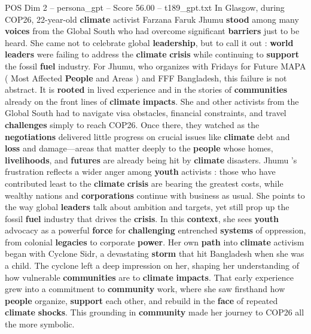 \begin{textsample}{POS Dim 2 – persona\_gpt – Score 56.00 – t189\_gpt.txt}  \label{ex:f2_pos_019}
In Glasgow, during COP26, 22-year-old \textbf{climate} activist Farzana Faruk Jhumu \textbf{stood} among many \textbf{voices} from the Global South who had overcome significant \textbf{barriers} just to be heard.
She came not to celebrate global \textbf{leadership}, but to call it out : \textbf{world} \textbf{leaders} were failing to address the \textbf{climate} \textbf{crisis} while continuing to \textbf{support} the fossil \textbf{fuel} industry.
For Jhumu, who organizes with Fridays for Future MAPA ( Most Affected \textbf{People} and Areas ) and FFF Bangladesh, this failure is not abstract.
It is \textbf{rooted} in lived experience and in the stories of \textbf{communities} already on the front lines of \textbf{climate} \textbf{impacts}.
She and other activists from the Global South had to navigate visa obstacles, financial constraints, and travel \textbf{challenges} simply to reach COP26.
Once there, they watched as the \textbf{negotiations} delivered little progress on crucial issues like \textbf{climate} debt and \textbf{loss} and damage—areas that matter deeply to the \textbf{people} whose homes, \textbf{livelihoods}, and \textbf{futures} are already being hit by \textbf{climate} disasters.
Jhumu ’s frustration reflects a wider anger among \textbf{youth} activists : those who have contributed least to the \textbf{climate} \textbf{crisis} are bearing the greatest costs, while wealthy nations and \textbf{corporations} continue with business as usual.
She points to the way global \textbf{leaders} talk about ambition and targets, yet still prop up the fossil \textbf{fuel} industry that drives the \textbf{crisis}.
In this \textbf{context}, she sees \textbf{youth} advocacy as a powerful \textbf{force} for \textbf{challenging} entrenched \textbf{systems} of oppression, from colonial \textbf{legacies} to corporate \textbf{power}.
Her own \textbf{path} into \textbf{climate} activism began with Cyclone Sidr, a devastating \textbf{storm} that hit Bangladesh when she was a child.
The cyclone left a deep impression on her, shaping her understanding of how vulnerable \textbf{communities} are to \textbf{climate} \textbf{impacts}.
That early experience grew into a commitment to \textbf{community} work, where she saw firsthand how \textbf{people} organize, \textbf{support} each other, and rebuild in the \textbf{face} of repeated \textbf{climate} \textbf{shocks}.
This grounding in \textbf{community} made her journey to COP26 all the more symbolic.

\end{textsample}
